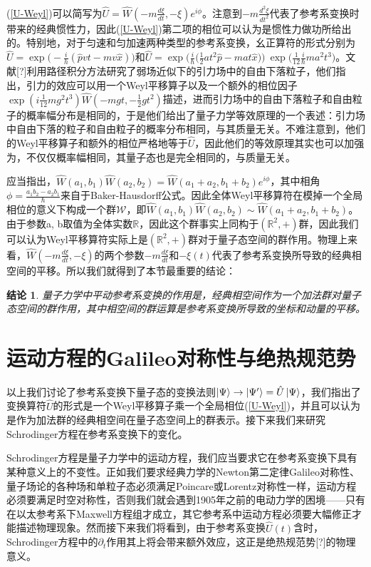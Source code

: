 \documentclass[a4paper]{article}
\newtheorem*{conclusion}{结论}
\begin{document}
        (\ref{U-Weyl})可以简写为$\hat{U}=\hat{W}(-m\frac{d\xi}{dt},-\xi)e^{i\phi}$。注意到$-m\frac{d^2\xi}{dt^2}$代表了参考系变换时带来的经典惯性力，因此(\ref{U-Weyl})第二项的相位可以认为是惯性力做功所给出的。特别地，对于匀速和匀加速两种类型的参考系变换，幺正算符的形式分别为$\hat{U}=\exp\big(-\frac{i}{h}(\hat{p}vt-mv\hat{x})\big)$和$\hat{U}=\exp\big(\frac{i}{\hbar}\big(\frac{1}{2}at^2\hat{p}-mat\hat{x} \big)\big)\ \exp\big(\frac{1}{12}\frac{i}{\hbar}ma^2t^3\big)$。文献[?]利用路径积分方法研究了弱场近似下的引力场中的自由下落粒子，他们指出，引力的效应可以用一个Weyl平移算子以及一个额外的相位因子$\exp(i\frac{1}{12}mg^2t^3)\hat{W}(-mgt,-\frac{1}{2}gt^2)$描述，进而引力场中的自由下落粒子和自由粒子的概率幅分布是相同的，于是他们给出了量子力学等效原理的一个表述：引力场中自由下落的粒子和自由粒子的概率分布相同，与其质量无关。不难注意到，他们的Weyl平移算子和额外的相位严格地等于$\hat{U}$，因此他们的等效原理其实也可以加强为，不仅仅概率幅相同，其量子态也是完全相同的，与质量无关。

        应当指出，$\hat{W}(a_1, b_1)\hat{W}(a_2, b_2)=\hat{W}(a_1+a_2, b_1+b_2)e^{i\phi}$，其中相角$\phi=\frac{a_1b_2-a_2b_1}{\hbar}$来自于Baker-Hausdorff公式。因此全体Weyl平移算符在模掉一个全局相位的意义下构成一个群$\mathcal{W}$，即$\hat{W}(a_1, b_1)\hat{W}(a_2, b_2)\sim\hat{W}(a_1+a_2, b_1+b_2)$。由于参数a, b取值为全体实数$\mathbb{R}$，因此这个群事实上同构于$(\mathbb{R}^2,+)$群，因此我们可以认为Weyl平移算符实际上是$(\mathbb{R}^2,+)$群对于量子态空间的群作用。物理上来看，$\hat{W}(-m\frac{d\xi}{dt}, -\xi)$的两个参数$-m\frac{d\xi}{dt}$和$-\xi(t)$代表了参考系变换所导致的经典相空间的平移。所以我们就得到了本节最重要的结论：

        \begin{conclusion}
            量子力学中平动参考系变换的作用是，经典相空间作为一个加法群对量子态空间的群作用，其中相空间的群运算是参考系变换所导致的坐标和动量的平移。
        \end{conclusion}
    

    \section{运动方程的Galileo对称性与绝热规范势}

        以上我们讨论了参考系变换下量子态的变换法则$\ket{\Psi}\to\ket{\Psi'}=\hat{U}\ket{\Psi}$，我们指出了变换算符$\hat{U}$的形式是一个Weyl平移算子乘一个全局相位(\ref{U-Weyl})，并且可以认为是作为加法群的经典相空间在量子态空间上的群表示。接下来我们来研究Schrodinger方程在参考系变换下的变化。

        Schrodinger方程是量子力学中的运动方程，我们应当要求它在参考系变换下具有某种意义上的不变性。正如我们要求经典力学的Newton第二定律Galileo对称性、量子场论的各种场和单粒子态必须满足Poincare或Lorentz对称性一样，运动方程必须要满足时空对称性，否则我们就会遇到1905年之前的电动力学的困境——只有在以太参考系下Maxwell方程组才成立，其它参考系中运动方程必须要大幅修正才能描述物理现象。然而接下来我们将看到，由于参考系变换$\hat{U}(t)$含时，Schrodinger方程中的$\partial_t$作用其上将会带来额外效应，这正是绝热规范势[?]的物理意义。
\end{document}
